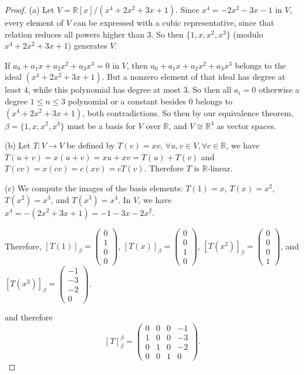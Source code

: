 \documentclass[addpoints,10pt]{exam}
\theoremstyle{plain}
\theoremstyle{definition}
\theoremstyle{plain}
\theoremstyle{plain}
\theoremstyle{definition}
\newcommand{\RR}{\ensuremath{\mathbb{R}}}
\begin{document}
\begin{proof}
(a)
Let $V=\RR[x]/(x^4+2x^2+3x+1)$. Since $x^{4}=-2x^2-3x-1$ in $V$, every element of $V$ can be expressed with a cubic representative, since that relation reduces all powers higher than $3$. So then $\{1,x,x^{2},x^{3}\}$ (modulo $x^4+2x^2+3x+1$) generates $V$.

If $a_0+a_1x+a_2x^2+a_3x^3=0$ in $V$, then
$a_0+a_1x+a_2x^2+a_3x^3$ belongs to the ideal
$(x^4+2x^2+3x+1)$. But a nonzero element of that ideal has degree at
least $4$, while this polynomial has degree at most $3$. So then all
$a_i=0$ otherwise a degree $1\leq n\leq 3$ polynomial or a constant besides $0$ belongs to $(x^4+2x^2+3x+1)$, both contradictions. So then by our equivalence theorem, $\beta=\{1,x,x^2,x^3\}$ must be a basis for $V$ over $\RR$, and $V\cong \RR^4$ as vector spaces.

(b)
Let $T:V\to V$ be defined by $T(v)=xv$. $\forall u,v\in V,\forall c\in\RR$, we have
$T(u+v)=x(u+v)=xu+xv=T(u)+T(v)$ and
$T(cv)=x(cv)=c(xv)=cT(v)$. Therefore $T$ is $\RR$-linear.

(c)
We compute the images of the basis elements:
$T(1)=x$, $T(x)=x^2$, $T(x^2)=x^3$, and
$T(x^3)=x^4$. In $V$, we have
$x^4=-(2x^2+3x+1)=-1-3x-2x^2$.

Therefore, 
$[T(1)]_\beta=\begin{pmatrix}0\\1\\0\\0\end{pmatrix}$,
$[T(x)]_\beta=\begin{pmatrix}0\\0\\1\\0\end{pmatrix}$,
$[T(x^2)]_\beta=\begin{pmatrix}0\\0\\0\\1\end{pmatrix}$, and
$[T(x^3)]_\beta=\begin{pmatrix}-1\\-3\\-2\\0\end{pmatrix}$.

and therefore
\[
[T]_\beta^\beta=
\begin{pmatrix}
0&0&0&-1\\
1&0&0&-3\\
0&1&0&-2\\
0&0&1&0
\end{pmatrix}.
\]

\end{proof}
\end{document}
